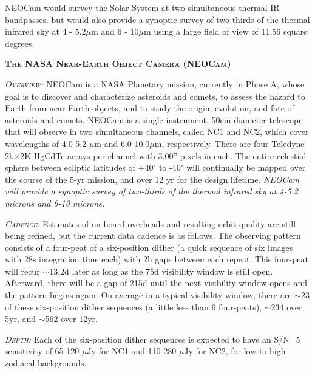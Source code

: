 \documentclass[12pt]{article}
\begin{document}
\smallskip
\smallskip
\noindent
NEOCam would survey the Solar System at two simultaneous thermal IR bandpasses. 
but would also provide a synoptic survey of two-thirds of the thermal infrared sky at 4 - 5.2$\mu$m and  6 - 10$\mu$m using a large field of view of 11.56 square degrees. 



\smallskip
\smallskip
\noindent
{\bfseries \textsc{\textcolor{Cerulean}{The NASA Near-Earth Object Camera (NEOCam)}}}

\textsl{\textsc{Overview:}}
NEOCam is a NASA Planetary mission, currently in Phase A, whose goal
is to discover and characterize asteroids and comets, to assess the
hazard to Earth from near-Earth objects, and to study the origin,
evolution, and fate of asteroids and comets. NEOCam is a
single-instrument, 50cm diameter telescope that will observe in two
simultaneous channels, called NC1 and NC2, which cover wavelengths of
4.0-5.2 $\mu$m and 6.0-10.0$\mu$m, respectively. There are four Teledyne
2k$\times$2K HgCdTe arrays per channel with 3.00'' pixels in each. The entire
celestial sphere between ecliptic latitudes of +40$^{\circ}$ to -40$^{\circ}$ will
continually be mapped over the course of the 5-yr mission, and over 12
yr for the design lifetime. 
{\it NEOCam will provide a synoptic survey of two-thirds of the thermal infrared sky at 4-5.2 microns and 6-10 microns.}

\smallskip
\smallskip
\noindent
\textsl{\textsc{Cadence:}} Estimates of on-board overheads and resulting orbit quality are still being refined, but the current data cadence is as follows. The observing pattern consists of a four-peat of a six-position dither (a quick sequence of six images with 28s integration time each) with 2h gaps between each repeat. This four-peat will recur $\sim$13.2d later as long as the 75d visibility window is still open. Afterward, there will be a gap of 215d until the next visibility window opens and the pattern begins again. On average in a typical visibility window, there are $\sim$23 of these six-position dither sequences (a little less than 6 four-peats), $\sim$234 over 5yr, and $\sim$562 over 12yr.

\smallskip
\smallskip
\noindent
\textsl{\textsc{Depth:}} Each of the six-position dither sequences is expected to have an S/N=5 sensitivity of 65-120 $\mu$Jy for NC1 and 110-280 $\mu$Jy for NC2, for low to high zodiacal backgrounds. 
\end{document}
